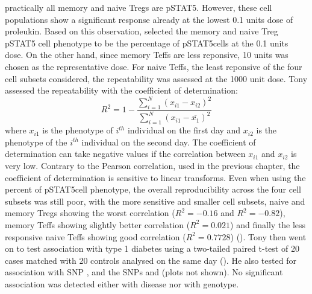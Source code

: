 practically all memory and naive Tregs are pSTAT5\positive.
However, these cell populations show a significant response already at the lowest 0.1 units dose of proleukin.
Based on this observation,  selected the
memory and naive Treg pSTAT5 cell phenotype to be the percentage of pSTAT5\positive cells at the 0.1 units dose.
On the other hand, since memory Teffs are less reponsive, 10 units was chosen as the representative dose.
For naive Teffs, the least reponsive of the four cell subsets considered, the repeatability was assessed at the 1000 unit dose.
Tony assessed the repeatability with the coefficient of determination:
\[
  R^2 = 1 - \frac{\sum_{i=1}^N (x_{i1}-x_{i2})^2}{\sum_{i=1}^N (x_{i1}-\overline{x_1})^2}
\]
where $x_{i1}$ is the phenotype of $i^{th}$ individual on the first day and $x_{i2}$
is the phenotype of the $i^{th}$ individual on the second day.
The coefficient of determination can take negative values if the correlation between $x_{i1}$ and $x_{i2}$ is very low.
Contrary to the Pearson correlation, used in the previous chapter, the coefficient of determination is sensitive to linear transforms.
Even when using the percent of pSTAT5\positive cell phenotype,
the overall reproducibility across the four cell subsets was still poor,
with the more sensitive and smaller cell subsets,
naive and memory Tregs showing the worst correlation ($R^2=-0.16$ and $R^2=-0.82$), memory Teffs showing slightly better correlation ($R^2=0.021$)
and finally the less responsive naive Teffs showing good correlation ($R^2=0.7728$) ().
Tony then went on to test association with type 1 diabetes using a two-tailed paired t-test of 20 cases matched with 20 controls analysed on the same
day ().
He also tested for association with  SNP , and the
 SNPs  and  (plots not shown).
No significant association was detected either with disease nor with genotype.

